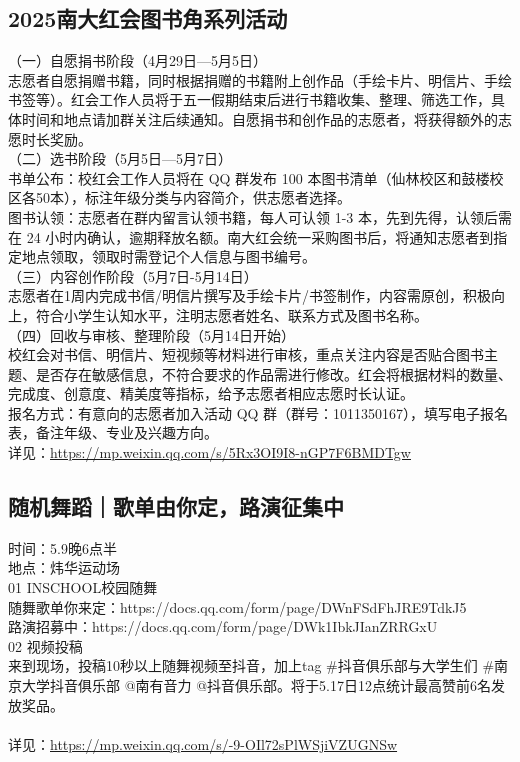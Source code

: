 \documentclass[letterpaper, 12pt]{article}
\begin{document}
\begin{multicols}{2}
\subsection{2025南大红会图书角系列活动} %
（一）自愿捐书阶段（4月29日—5月5日）
\\志愿者自愿捐赠书籍，同时根据捐赠的书籍附上创作品（手绘卡片、明信片、手绘书签等）。红会工作人员将于五一假期结束后进行书籍收集、整理、筛选工作，具体时间和地点请加群关注后续通知。自愿捐书和创作品的志愿者，将获得额外的志愿时长奖励。
\\（二）选书阶段（5月5日—5月7日）
\\书单公布：校红会工作人员将在 QQ 群发布 100 本图书清单（仙林校区和鼓楼校区各50本），标注年级分类与内容简介，供志愿者选择。
\\图书认领：志愿者在群内留言认领书籍，每人可认领 1-3 本，先到先得，认领后需在 24 小时内确认，逾期释放名额。南大红会统一采购图书后，将通知志愿者到指定地点领取，领取时需登记个人信息与图书编号。
\\（三）内容创作阶段（5月7日-5月14日）
\\志愿者在1周内完成书信/明信片撰写及手绘卡片/书签制作，内容需原创，积极向上，符合小学生认知水平，注明志愿者姓名、联系方式及图书名称。
\\（四）回收与审核、整理阶段（5月14日开始）
\\校红会对书信、明信片、短视频等材料进行审核，重点关注内容是否贴合图书主题、是否存在敏感信息，不符合要求的作品需进行修改。红会将根据材料的数量、完成度、创意度、精美度等指标，给予志愿者相应志愿时长认证。
\\报名方式：有意向的志愿者加入活动 QQ 群（群号：1011350167），填写电子报名表，备注年级、专业及兴趣方向。
\\详见：\url{https://mp.weixin.qq.com/s/5Rx3OI9I8-nGP7F6BMDTgw}

\subsection{随机舞蹈｜歌单由你定，路演征集中} %
时间：5.9晚6点半
\\地点：炜华运动场
\\01 INSCHOOL校园随舞  
\\随舞歌单你来定：https://docs.qq.com/form/page/DWnFSdFhJRE9TdkJ5
\\路演招募中：https://docs.qq.com/form/page/DWk1IbkJIanZRRGxU
\\02 视频投稿
\\来到现场，投稿10秒以上随舞视频至抖音，加上tag \#抖音俱乐部与大学生们 \#南京大学抖音俱乐部 @南有音力 @抖音俱乐部。将于5.17日12点统计最高赞前6名发放奖品。                    
\\
\\详见：\url{https://mp.weixin.qq.com/s/-9-OIl72sPlWSjiVZUGNSw}


\end{multicols}
\end{document}

